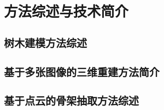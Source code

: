 



\chapter{方法综述与技术简介}
\label{cha:methodsandtechniques}

\section{树木建模方法综述}
\label{sec:treemodelingmethods}

\section{基于多张图像的三维重建方法简介}
\label{sec:mulimg3drecmethods}

\section{基于点云的骨架抽取方法综述}
\label{sec:treesklextraction}

